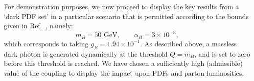 \documentclass[withindex,glossary]{cam-thesis}
\begin{document}
\noindent For demonstration purposes, we now proceed to display the key
results from a `dark PDF set' in a particular scenario
that is permitted according to the bounds given in
Ref.~\cite{Ilten:2018crw}, namely:
\begin{equation}
  \label{eq:value}
  m_B = 50\,\, \text{GeV}, \qquad \alpha_B = 3 \times 10^{-3},
\end{equation}
which corresponds to taking $g_B = 1.94 \times 10^{-1}$. As described
above, a massless dark photon is generated dynamically at the threshold $Q = m_B$, and is set
to zero before this threshold is reached. We have chosen a sufficiently
high (admissible) value of the coupling to display the impact
upon PDFs and parton luminosities. 
%
\end{document}
